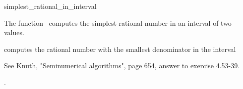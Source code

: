 \begin{ccRefFunction}{simplest_rational_in_interval}

\ccDefinition

The function \ccRefName\ computes the simplest rational number in an
interval of two  values.


{
computes the rational number with the smallest denominator in the 
interval 
}

\ccImplementation

See Knuth, "Seminumerical algorithms", page 654, answer to exercise
4.53-39.

\ccSeeAlso

.

\end{ccRefFunction}
